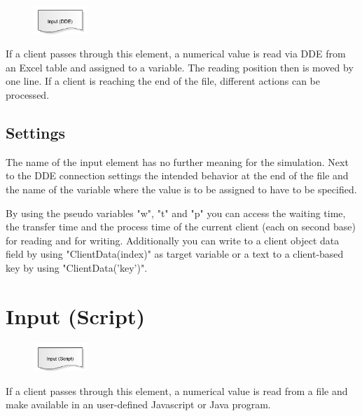 \begin{figure}
\vspace{-22pt}
\includegraphics[width=2cm]{imageModelElementInputDDE.png}
\vspace{-22pt}
\end{figure}

If a client passes through this element, a numerical value is read via DDE from an
Excel table and assigned to a variable. The reading position then is moved by one line.
If a client is reaching the end of the file, different actions can be processed.

\subsection*{Settings}

The name of the input element has no further meaning for the simulation.
Next to the DDE connection settings the intended behavior at the end of the file and the name of the variable
where the value is to be assigned to have to be specified.

By using the pseudo variables "w", "t" and "p" you can access the waiting time, the transfer time and the
process time of the current client (each on second base) for reading and for writing. Additionally you can
write to a client object data field by using "ClientData(index)" as target variable or a text to a client-based
key by using "ClientData('key')".


\section{Input (Script)}
\label{ref:ModelElementInputJS}

\begin{figure}
\vspace{-22pt}
\includegraphics[width=2cm]{imageModelElementInputJS.png}
\vspace{-22pt}
\end{figure}

If a client passes through this element, a numerical value is read from a file
and make available in an user-defined Javascript or Java program.


